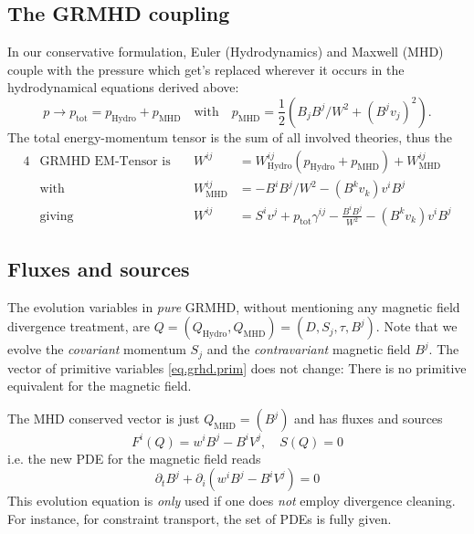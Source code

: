 \documentclass[a4paper]{article}
\newcommand{\desc}[1]{\text{#1}\quad}
\newcommand{\hydro}{\text{Hydro}}
\newcommand{\mhd}{\text{MHD}}
\begin{document}
\subsection{The GRMHD coupling}
In our conservative formulation, Euler (Hydrodynamics) and Maxwell (MHD)
couple with the pressure which get's replaced wherever it occurs in the
hydrodynamical equations derived above:
\begin{equation}
p \to p_\text{tot} = p_\hydro + p_\mhd
\quad\text{with}\quad
p_\mhd = \frac 12 \left( B_j B^j / W^2 + (B^j v_j)^2 \right).
\end{equation}
The total energy-momentum tensor is the sum of all involved theories,
thus the
\begin{alignat}{4}
& \desc{GRMHD EM-Tensor is}
& W^{ij} &= W^{ij}_\hydro(p_\hydro + p_\mhd) + W^{ij}_\mhd
\\
&\desc{with}
& W^{ij}_\mhd &= - B^i B^j / W^2 - (B^k v_k) v^i B^j
\\
&\desc{giving}
& W^{ij} &= 
S^i v^j + p_\text{tot} \gamma^{ij} - \frac{B^i B^j}{W^2} - (B^k v_k)v^i B^j
\end{alignat}

\subsection{Fluxes and sources}
The evolution variables in \emph{pure} GRMHD, without mentioning any
magnetic field divergence treatment, are 
$Q = (Q_\hydro, Q_\mhd) = (D, S_j, \tau, B^j)$.
Note that we evolve the \emph{covariant} momentum $S_j$ and the
\emph{contravariant} magnetic field $B^j$. The vector of primitive
variables \eqref{eq.grhd.prim} does not change: There is no primitive
equivalent for the magnetic field.

The MHD conserved vector is just $Q_\mhd=(B^j)$ and has fluxes and sources
\begin{equation}
F^i(Q) = w^i B^j - B^i V^j,
\quad S(Q) = 0
\end{equation}
i.e. the new PDE for the magnetic field reads
\begin{equation}\label{eq.grmhd.pdeb.simple}
\partial_t B^j + \partial_i (w^i B^j - B^i V^j) = 0
\end{equation}
This evolution equation is \emph{only} used if one does \emph{not} employ
divergence cleaning. For instance, for constraint transport, the set
of PDEs is fully given.
\end{document}
